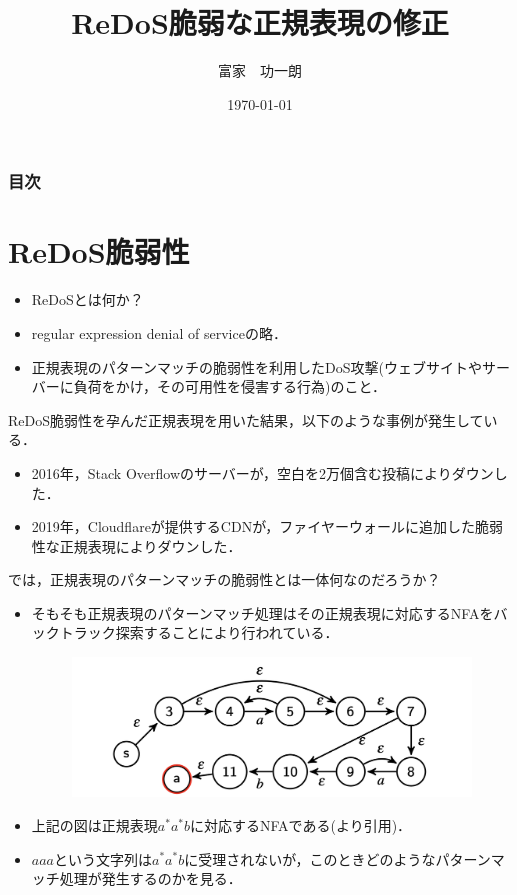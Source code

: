 \documentclass[uplatex,dvipdfmx,11pt,notheorems,aspectratio = 169]{beamer}
\title[略タイトル]{ReDoS脆弱な正規表現の修正}%
\author[富家]{富家　功一朗}%
\institute[JPN]{早稲田大学基幹理工学部情報理工学科}%
\date{\today}%
\theoremstyle{definition}
\begin{document}
\begin{frame}[plain]\frametitle{}
\titlepage %
\end{frame}

\begin{frame}\frametitle{目次}
\tableofcontents %
\end{frame}


\section{ReDoS脆弱性}
\begin{frame}
  \begin{itemize}
    \item ReDoSとは何か？
    \item regular expression denial of serviceの略．
    \item 正規表現のパターンマッチの脆弱性を利用したDoS攻撃(ウェブサイトやサーバーに負荷をかけ，その可用性を侵害する行為)のこと．
  \end{itemize}
\end{frame}

\begin{frame}
  ReDoS脆弱性を孕んだ正規表現を用いた結果，以下のような事例が発生している．
  \begin{itemize}
    \item 2016年，Stack Overflowのサーバーが，空白を2万個含む投稿によりダウンした\cite{stackoverflow}．
    \item 2019年，Cloudflareが提供するCDNが，ファイヤーウォールに追加した脆弱性な正規表現によりダウンした\cite{cloudflare}．
  \end{itemize}
\end{frame}

\begin{frame}
  では，正規表現のパターンマッチの脆弱性とは一体何なのだろうか？
\end{frame}

\begin{frame}
  \begin{itemize}
    \item そもそも正規表現のパターンマッチ処理はその正規表現に対応するNFAをバックトラック探索することにより行われている．
  \begin{figure}[H] %
    \centering
    \includegraphics[width=0.75\linewidth]{a*a*b.png}
  \end{figure}
    \item 上記の図は正規表現$a^*a^*b$に対応するNFAである(\cite{javascript}より引用)．
    \item $aaa$という文字列は$a^*a^*b$に受理されないが，このときどのようなパターンマッチ処理が発生するのかを見る．
  \end{itemize}
\end{frame}
\end{document}
